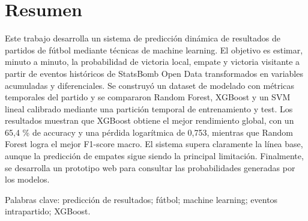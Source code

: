 \chapter{Resumen}
Este trabajo desarrolla un sistema de predicción dinámica de resultados de partidos de fútbol mediante técnicas de machine learning. El objetivo es estimar, minuto a minuto, la probabilidad de victoria local, empate y victoria visitante a partir de eventos históricos de StatsBomb Open Data transformados en variables acumuladas y diferenciales. Se construyó un dataset de modelado con métricas temporales del partido y se compararon Random Forest, XGBoost y un SVM lineal calibrado mediante una partición temporal de entrenamiento y test. Los resultados muestran que XGBoost obtiene el mejor rendimiento global, con un 65,4 \% de accuracy y una pérdida logarítmica de 0,753, mientras que Random Forest logra el mejor F1-score macro. El sistema supera claramente la línea base, aunque la predicción de empates sigue siendo la principal limitación. Finalmente, se desarrolla un prototipo web para consultar las probabilidades generadas por los modelos.

Palabras clave: predicción de resultados; fútbol; machine learning; eventos intrapartido; XGBoost.

